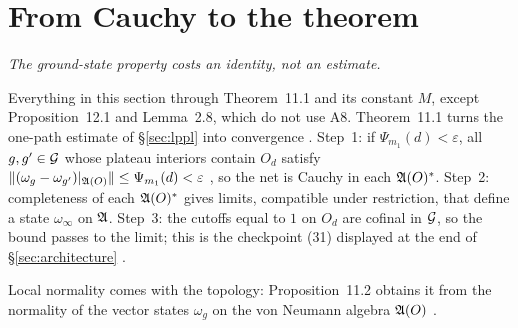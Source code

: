 \section{From Cauchy to the theorem}\label{sec:identification}

\emph{The ground-state property costs an identity, not an estimate.}

Everything in this section  through Theorem~11.1 and its constant
$M$, except Proposition~12.1 and Lemma~2.8, which do not use A8. Theorem~11.1 turns the
one-path estimate of \S\ref{sec:lppl} into convergence . Step~1:
if $\Psi_{m_1}(d)<\varepsilon$, all $g,g'\in\mathcal{G}$ whose plateau interiors contain $O_d$
satisfy $\|(\omega_g-\omega_{g'})|_{\mathfrak{A}(O)}\|\le\Psi_{m_1}(d)<\varepsilon$ ,
so the net is Cauchy in each $\mathfrak{A}(O)^*$. Step~2: completeness of each $\mathfrak{A}(O)^*$ gives
limits, compatible under restriction, that define a state $\omega_\infty$ on $\mathfrak{A}$.
Step~3: the cutoffs equal to $1$ on $O_d$ are cofinal in $\mathcal{G}$, so the bound passes to
the limit; this is the checkpoint (31) displayed at the end of \S\ref{sec:architecture}
.

Local normality comes with the topology: Proposition~11.2 obtains it from the
normality of the vector states $\omega_g$ on the von Neumann algebra $\mathfrak{A}(O)$
.

